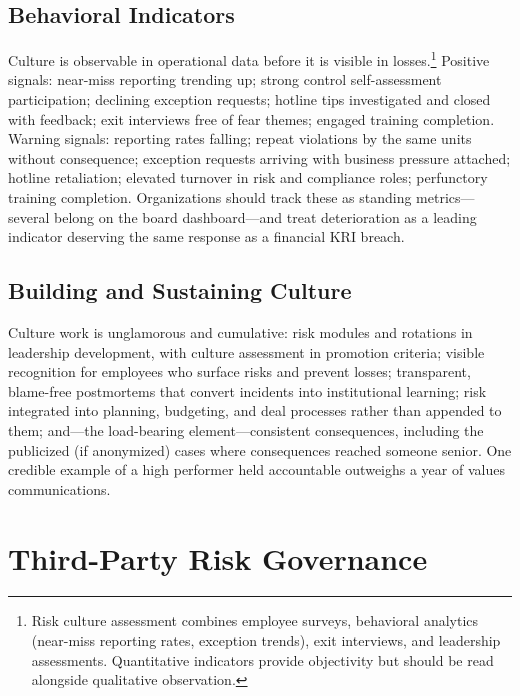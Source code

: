 \documentclass[11pt,openany]{book}
\begin{document}
\subsection{Behavioral Indicators}
\label{subsec:behavioral}

Culture is observable in operational data before it is visible in
losses.\footnote{Risk culture assessment combines employee surveys,
behavioral analytics (near-miss reporting rates, exception trends), exit
interviews, and leadership assessments. Quantitative indicators provide
objectivity but should be read alongside qualitative observation.} Positive
signals: near-miss reporting trending up; strong control self-assessment
participation; declining exception requests; hotline tips investigated and
closed with feedback; exit interviews free of fear themes; engaged training
completion. Warning signals: reporting rates falling; repeat violations by
the same units without consequence; exception requests arriving with business
pressure attached; hotline retaliation; elevated turnover in risk and
compliance roles; perfunctory training completion. Organizations should track
these as standing metrics---several belong on the board dashboard---and treat
deterioration as a leading indicator deserving the same response as a
financial KRI breach.

\subsection{Building and Sustaining Culture}

Culture work is unglamorous and cumulative: risk modules and rotations in
leadership development, with culture assessment in promotion criteria;
visible recognition for employees who surface risks and prevent losses;
transparent, blame-free postmortems that convert incidents into institutional
learning; risk integrated into planning, budgeting, and deal processes rather
than appended to them; and---the load-bearing element---consistent
consequences, including the publicized (if anonymized) cases where
consequences reached someone senior. One credible example of a high performer
held accountable outweighs a year of values communications.

\section{Third-Party Risk Governance}
\label{sec:tprm}
\end{document}
